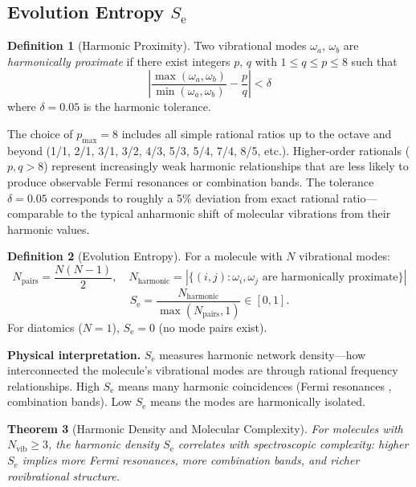 \documentclass[11pt,a4paper]{article}
\newtheorem{theorem}{Theorem}[section]
\theoremstyle{definition}
\newtheorem{definition}[theorem]{Definition}
\theoremstyle{remark}
\newcommand{\Se}{S_{\mathrm{e}}}
\newcommand{\Nvib}{N_{\mathrm{vib}}}
\begin{document}
\subsection{Evolution Entropy \texorpdfstring{$\Se$}{S\_e}}

\begin{definition}[Harmonic Proximity]
\label{def:harmonic}
Two vibrational modes $\omega_a$, $\omega_b$ are \emph{harmonically proximate} if there exist integers $p$, $q$ with $1 \leq q \leq p \leq 8$ such that
\begin{equation}
\left|\frac{\max(\omega_a, \omega_b)}{\min(\omega_a, \omega_b)} - \frac{p}{q}\right| < \delta
\label{eq:harmonic_proximity}
\end{equation}
where $\delta = 0.05$ is the harmonic tolerance.
\end{definition}

The choice of $p_{\max} = 8$ includes all simple rational ratios up to the octave and beyond (1/1, 2/1, 3/1, 3/2, 4/3, 5/3, 5/4, 7/4, 8/5, etc.). Higher-order rationals ($p, q > 8$) represent increasingly weak harmonic relationships that are less likely to produce observable Fermi resonances or combination bands. The tolerance $\delta = 0.05$ corresponds to roughly a 5\% deviation from exact rational ratio---comparable to the typical anharmonic shift of molecular vibrations from their harmonic values.

\begin{definition}[Evolution Entropy]
\label{def:s_e}
For a molecule with $N$ vibrational modes:
\begin{equation}
N_{\mathrm{pairs}} = \frac{N(N-1)}{2}, \quad
N_{\mathrm{harmonic}} = \left|\{(i,j) : \omega_i, \omega_j \text{ are harmonically proximate}\}\right|
\end{equation}
\begin{equation}
\Se = \frac{N_{\mathrm{harmonic}}}{\max(N_{\mathrm{pairs}}, 1)} \in [0, 1].
\label{eq:s_e}
\end{equation}
For diatomics ($N = 1$), $\Se = 0$ (no mode pairs exist).
\end{definition}

\textbf{Physical interpretation.} $\Se$ measures harmonic network density---how interconnected the molecule's vibrational modes are through rational frequency relationships. High $\Se$ means many harmonic coincidences (Fermi resonances \citep{fermi1931}, combination bands). Low $\Se$ means the modes are harmonically isolated.

\begin{theorem}[Harmonic Density and Molecular Complexity]
\label{thm:harmonic_complexity}
For molecules with $\Nvib \geq 3$, the harmonic density $\Se$ correlates with spectroscopic complexity: higher $\Se$ implies more Fermi resonances, more combination bands, and richer rovibrational structure.
\end{theorem}
\end{document}
